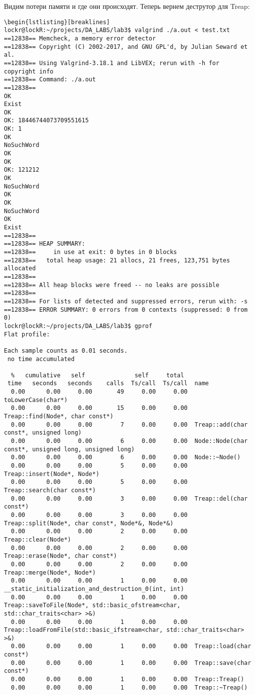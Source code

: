 \documentclass[12pt]{article}
\begin{document}
\newpage
Видим потери памяти и где они происходят. Теперь вернем деструтор для Treap:
\begin{lstlisting}[breaklines]\begin{lstlisting}[breaklines]
lockr@lockR:~/projects/DA_LABS/lab3$ valgrind ./a.out < test.txt
==12838== Memcheck, a memory error detector
==12838== Copyright (C) 2002-2017, and GNU GPL'd, by Julian Seward et al.
==12838== Using Valgrind-3.18.1 and LibVEX; rerun with -h for copyright info
==12838== Command: ./a.out
==12838== 
OK
Exist
OK
OK: 18446744073709551615
OK: 1
OK
NoSuchWord
OK
OK
OK: 121212
OK
NoSuchWord
OK
OK
NoSuchWord
OK
Exist
==12838== 
==12838== HEAP SUMMARY:
==12838==     in use at exit: 0 bytes in 0 blocks
==12838==   total heap usage: 21 allocs, 21 frees, 123,751 bytes allocated
==12838== 
==12838== All heap blocks were freed -- no leaks are possible
==12838== 
==12838== For lists of detected and suppressed errors, rerun with: -s
==12838== ERROR SUMMARY: 0 errors from 0 contexts (suppressed: 0 from 0)
lockr@lockR:~/projects/DA_LABS/lab3$ gprof
Flat profile:

Each sample counts as 0.01 seconds.
 no time accumulated

  %   cumulative   self              self     total           
 time   seconds   seconds    calls  Ts/call  Ts/call  name    
  0.00      0.00     0.00       49     0.00     0.00  toLowerCase(char*)
  0.00      0.00     0.00       15     0.00     0.00  Treap::find(Node*, char const*)
  0.00      0.00     0.00        7     0.00     0.00  Treap::add(char const*, unsigned long)
  0.00      0.00     0.00        6     0.00     0.00  Node::Node(char const*, unsigned long, unsigned long)
  0.00      0.00     0.00        6     0.00     0.00  Node::~Node()
  0.00      0.00     0.00        5     0.00     0.00  Treap::insert(Node*, Node*)
  0.00      0.00     0.00        5     0.00     0.00  Treap::search(char const*)
  0.00      0.00     0.00        3     0.00     0.00  Treap::del(char const*)
  0.00      0.00     0.00        3     0.00     0.00  Treap::split(Node*, char const*, Node*&, Node*&)
  0.00      0.00     0.00        2     0.00     0.00  Treap::clear(Node*)
  0.00      0.00     0.00        2     0.00     0.00  Treap::erase(Node*, char const*)
  0.00      0.00     0.00        2     0.00     0.00  Treap::merge(Node*, Node*)
  0.00      0.00     0.00        1     0.00     0.00  __static_initialization_and_destruction_0(int, int)
  0.00      0.00     0.00        1     0.00     0.00  Treap::saveToFile(Node*, std::basic_ofstream<char, std::char_traits<char> >&)
  0.00      0.00     0.00        1     0.00     0.00  Treap::loadFromFile(std::basic_ifstream<char, std::char_traits<char> >&)
  0.00      0.00     0.00        1     0.00     0.00  Treap::load(char const*)
  0.00      0.00     0.00        1     0.00     0.00  Treap::save(char const*)
  0.00      0.00     0.00        1     0.00     0.00  Treap::Treap()
  0.00      0.00     0.00        1     0.00     0.00  Treap::~Treap()


\end{lstlisting}
\end{document}
